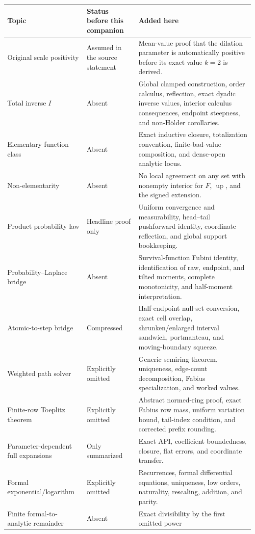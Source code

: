 \documentclass[11pt,oneside]{article}
\theoremstyle{definition}
\theoremstyle{remark}
\newcommand{\Up}{\operatorname{up}}
\begin{document}
\begingroup\small
\begin{longtable}{@{}p{}p{}p{}@{}}
\toprule
Topic & Status before this companion & Added here\\
\midrule
\endhead
Original scale positivity & Assumed in the source statement & Mean-value proof that the dilation
parameter is automatically positive before its exact value $k=2$ is derived.\\
Total inverse $I$ & Absent & Global clamped construction, order calculus, reflection, exact
dyadic inverse values, interior calculus consequences, endpoint steepness, and non-H\"older
corollaries.\\
Elementary function class & Absent & Exact inductive closure, totalization convention,
finite-bad-value composition, and dense-open analytic locus.\\
Non-elementarity & Absent & No local agreement on any set with nonempty interior for $F$,
$\Up$, and the signed extension.\\
Product probability law & Headline proof only & Uniform convergence and measurability,
head--tail pushforward identity, coordinate reflection, and global support bookkeeping.\\
Probability--Laplace bridge & Absent & Survival-function Fubini identity, identification of
raw, endpoint, and tilted moments, complete monotonicity, and half-moment interpretation.\\
Atomic-to-step bridge & Compressed & Half-endpoint null-set conversion, exact cell overlap,
shrunken/enlarged interval sandwich, portmanteau, and moving-boundary squeeze.\\
Weighted path solver & Explicitly omitted & Generic semiring theorem, uniqueness, edge-count
decomposition, Fabius specialization, and worked values.\\
Finite-row Toeplitz theorem & Explicitly omitted & Abstract normed-ring proof, exact Fabius
row mass, uniform variation bound, tail-index condition, and corrected prefix rounding.\\
Parameter-dependent full expansions & Only summarized & Exact API, coefficient boundedness,
closure, flat errors, and coordinate transfer.\\
Formal exponential/logarithm & Explicitly omitted & Recurrences, formal differential equations,
uniqueness, low orders, naturality, rescaling, addition, and parity.\\
Finite formal-to-analytic remainder & Absent & Exact divisibility by the first omitted power

\end{longtable}
\end{document}
